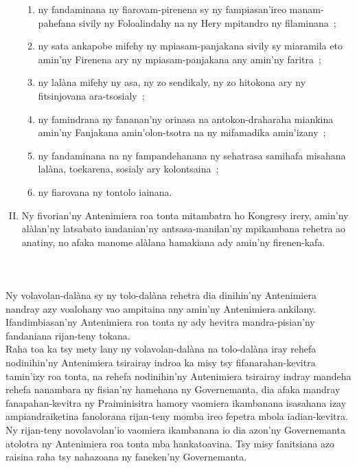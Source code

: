 \documentclass[12pt]{article}
\newcounter{laharana}
\newcommand{\andininy}[0]{
  \paragraph{%
    \NoCaseChange{%
      Andininy~\addtocounter{laharana}{1}\thelaharana.}\label{and:\thelaharana}~%
  }%
}
\begin{document}
\begin{enumerate}[I.]
\begin{enumerate}[1.]
  \item ny fandaminana ny fiarovam-pirenena sy ny fampiasan'ireo manam-pahefana
    sivily ny Foloalindahy na ny Hery mpitandro ny filaminana~;

  \item ny sata ankapobe mifehy ny mpiasam-panjakana sivily sy miaramila eto
    amin'ny Firenena ary ny mpiasam-panjakana any amin'ny faritra~;

  \item ny lalàna mifehy ny asa, ny zo sendikaly, ny zo hitokona ary ny
    fitsinjovana ara-tsosialy~;

  \item ny famindrana ny fananan'ny orinasa na antokon-draharaha miankina
    amin'ny Fanjakana amin'olon-tsotra na ny mifamadika amin'izany~;

  \item ny fandaminana na ny fampandehanana ny sehatrasa samihafa misahana
    lalàna, toekarena, sosialy ary kolontsaina~;

  \item ny fiarovana ny tontolo iainana.
 
  \end{enumerate}
\item Ny fivorian'ny Antenimiera roa tonta mitambatra ho Kongresy irery, amin'ny
  alàlan'ny latsabato iandanian'ny antsasa-manilan'ny mpikambana rehetra ao
  anatiny, no afaka manome alàlana hamakiana ady amin'ny firenen-kafa.
\end{enumerate}


\andininy{}Ny volavolan-dalàna sy ny tolo-dalàna rehetra dia dinihin'ny
Antenimiera nandray azy voalohany vao ampitaina any amin'ny Antenimiera
ankilany. Ifandimbiasan'ny Antenimiera roa tonta ny ady hevitra mandra-pisian'ny
fandaniana rijan-teny tokana.\\

\noindent
Raha toa ka tsy mety lany ny volavolan-dalàna na tolo-dalàna iray rehefa
nodinihin'ny Antenimiera tsirairay indroa ka misy tsy fifanarahan-kevitra
tamin'izy roa tonta, na rehefa nodinihin'ny Antenimiera tsirairay indray mandeha
rehefa nanambara ny fisian'ny hamehana ny Governemanta, dia afaka mandray
fanapahan-kevitra ny Praiminisitra hamory vaomiera ikambanana isasahana izay
ampiandraiketina fanolorana rijan-teny momba ireo fepetra mbola
iadian-kevitra. Ny rijan-teny novolavolan'io vaomiera ikambanana io dia azon'ny
Governemanta atolotra ny Antenimiera roa tonta mba hankatoavina. Tsy misy
fanitsiana azo raisina raha tsy nahazoana ny faneken'ny Governemanta.\\
\end{document}
